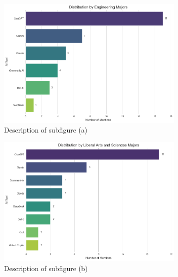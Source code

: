 \documentclass[12pt]{article}
\begin{document}
\begin{figure}[htbp]
  \centering
  \begin{subfigure}[b]{0.45\textwidth}
    \includegraphics[width=\textwidth]{fig4-1.png} %
    \caption{Description of subfigure (a)}
    \label{fig:subfig1a}
  \end{subfigure}
  \hfill %
  \begin{subfigure}[b]{0.45\textwidth}
    \includegraphics[width=\textwidth]{fig4-2.png} %
    \caption{Description of subfigure (b)}
    \label{fig:subfig1b}
  \end{subfigure}
  \hfill %
  \begin{subfigure}[b]{0.45\textwidth}

\end{subfigure}
\end{figure}
\end{document}
